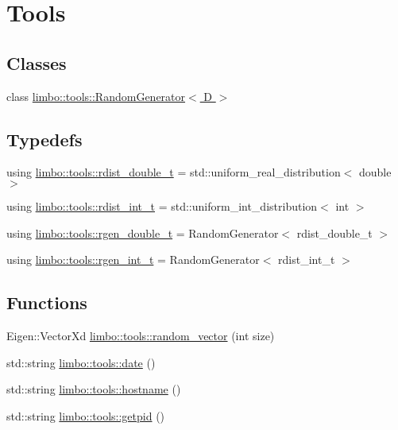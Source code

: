 \hypertarget{group__tools}{}\section{Tools}
\label{group__tools}
\subsection*{Classes}
\begin{DoxyCompactItemize}
\item 
class \hyperlink{classlimbo_1_1tools_1_1_random_generator}{limbo\+::tools\+::\+Random\+Generator$<$ D $>$}
\end{DoxyCompactItemize}
\subsection*{Typedefs}
\begin{DoxyCompactItemize}
\item 
using \hyperlink{group__tools_gab2609bfef1e3bdb8b44c0d6c8c139927}{limbo\+::tools\+::rdist\+\_\+double\+\_\+t} = std\+::uniform\+\_\+real\+\_\+distribution$<$ double $>$
\item 
using \hyperlink{group__tools_gacb322b4600b2e500dbcd24661a749f49}{limbo\+::tools\+::rdist\+\_\+int\+\_\+t} = std\+::uniform\+\_\+int\+\_\+distribution$<$ int $>$
\item 
using \hyperlink{group__tools_gacdb2963659056fc5fa9f94405f59a851}{limbo\+::tools\+::rgen\+\_\+double\+\_\+t} = Random\+Generator$<$ rdist\+\_\+double\+\_\+t $>$
\item 
using \hyperlink{group__tools_ga3df78ebcb864be91e73e840bb42b9208}{limbo\+::tools\+::rgen\+\_\+int\+\_\+t} = Random\+Generator$<$ rdist\+\_\+int\+\_\+t $>$
\end{DoxyCompactItemize}
\subsection*{Functions}
\begin{DoxyCompactItemize}
\item 
Eigen\+::\+Vector\+Xd \hyperlink{group__tools_ga2a64df3120a3ecd84e62640fb43722d0}{limbo\+::tools\+::random\+\_\+vector} (int size)
\item 
std\+::string \hyperlink{group__tools_gafb48d3271e7423f8b8d94599869bd9cb}{limbo\+::tools\+::date} ()
\item 
std\+::string \hyperlink{group__tools_ga4810ffa502d791d6ad750739a953f56f}{limbo\+::tools\+::hostname} ()
\item 
std\+::string \hyperlink{group__tools_ga4ee13d198367d07cabd37316e671db09}{limbo\+::tools\+::getpid} ()
\end{DoxyCompactItemize}


